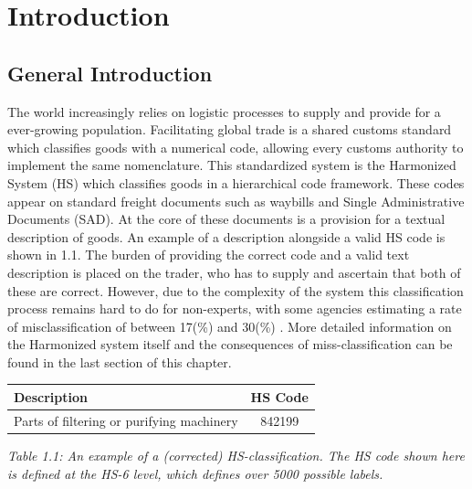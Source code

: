 \UseRawInputEncoding
\chapter{Introduction}\label{ch:intro}
\section{General Introduction}
The world increasingly relies on logistic processes to supply and provide for
a ever-growing population. Facilitating global trade is a shared customs
standard which classifies goods with a numerical code, allowing every customs
authority to implement the same nomenclature. This standardized
system is the Harmonized System (HS) which classifies goods in a hierarchical
code framework. These codes appear on standard freight documents
such as waybills and Single Administrative Documents (SAD). At the core
of these documents is a provision for a textual description of goods. An
example of a description alongside a valid HS code is shown in 1.1. The
burden of providing the correct code and a valid text description is placed
on the trader, who has to supply and ascertain that both of these are correct.
However, due to the complexity of the system this classification process
remains hard to do for non-experts, with some agencies estimating a rate of
misclassification of between 17(\%) and 30(\%) \cite{OfficeoftheAuditorGeneralofCanadaGovernmentofCanada.2010}. More detailed information
on the Harmonized system itself and the consequences of miss-classification
can be found in the last section of this chapter. \\

\begin{center}
    \begin{tabular}{lc} \hline \centering
Description & HS Code \\ \hline
Parts of filtering or purifying machinery & 842199 \\ \hline
	\end{tabular}
\end{center}
{\textit{Table 1.1: An example of a (corrected) HS-classification. The HS code shown here is defined at the HS-6 level, which defines over 5000 possible labels.}} \\

